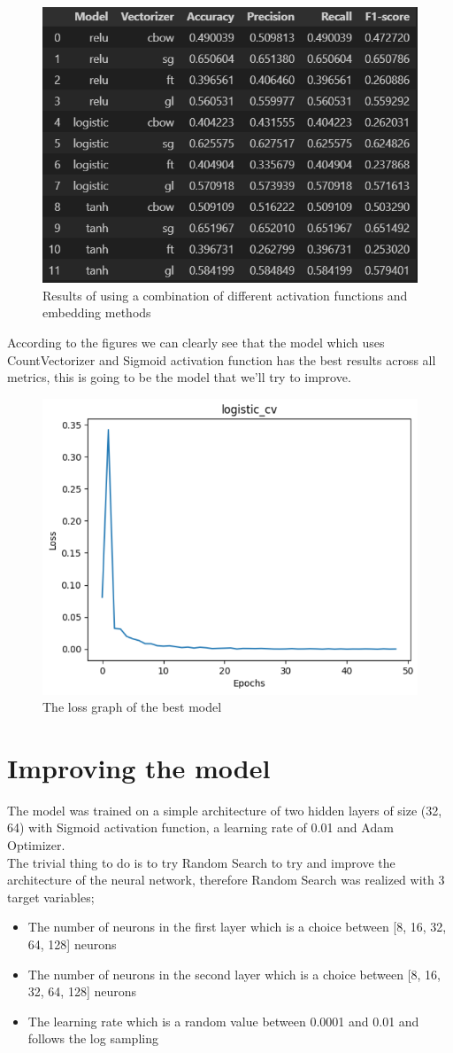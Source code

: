\documentclass[12pt, a4paper]{article}
\begin{document}
\begin{figure}[H]
    \centering
    \includegraphics[width=0.5\linewidth]{df2.png}
    \caption{Results of using a combination of different activation functions and embedding methods}
    \label{fig:enter-label}
\end{figure}

According to the figures we can clearly see that the model which uses CountVectorizer and Sigmoid activation function has the best results across all metrics, this is going to be the model that we'll try to improve.

\begin{figure}[H]
    \centering
    \includegraphics[width=0.5\linewidth]{cvloss.png}
    \caption{The loss graph of the best model}
    \label{fig:enter-label}
\end{figure}

\section{Improving the model}
The model was trained on a simple architecture of two hidden layers of size (32, 64) with Sigmoid activation function, a learning rate of 0.01 and Adam Optimizer. \newline \\
The trivial thing to do is to try Random Search to try and improve the architecture of the neural network, therefore Random Search was realized with 3 target variables; 
\begin{itemize}
    \item The number of neurons in the first layer which is a choice between [8, 16, 32, 64, 128] neurons
    \item The number of neurons in the second layer which is a choice between [8, 16, 32, 64, 128] neurons
    \item The learning rate which is a random value between 0.0001 and 0.01 and follows the log sampling  \\
\end{itemize}
\end{document}
